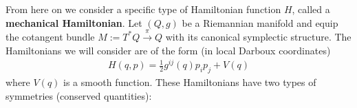     From here on we consider a specific type of Hamiltonian function $H$, called a \textbf{mechanical Hamiltonian}. Let $(Q, g)$ be a Riemannian manifold and equip the cotangent bundle $M:=T^*Q\overset{\pi}{\rightarrow}Q$ with its canonical symplectic structure. The Hamiltonians we will consider are of the form (in local Darboux coordinates)
    \begin{gather}
        H(q, p) = \frac{1}{2}g^{ij}(q)p_ip_j + V(q)
    \end{gather}
    where $V(q)$ is a smooth function. These Hamiltonians have two types of symmetries (conserved quantities):

